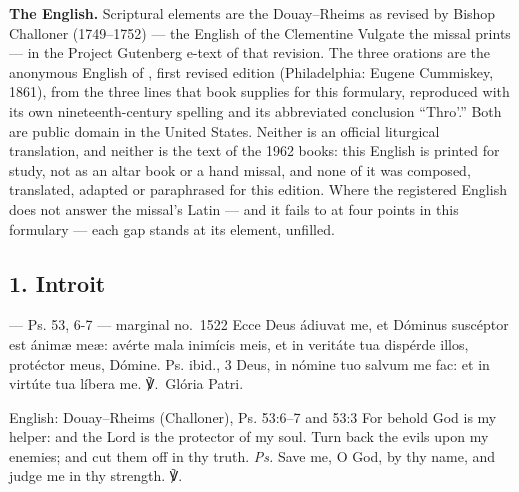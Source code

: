 \textbf{The English.} Scriptural elements are the Douay--Rheims as revised by
Bishop Challoner (1749--1752) --- the English of the Clementine Vulgate the
missal prints --- in the Project Gutenberg e-text of that revision. The three
orations are the anonymous English of , first revised edition
(Philadelphia: Eugene Cummiskey, 1861), from the three lines that book
supplies for this formulary, reproduced with its own nineteenth-century
spelling and its abbreviated conclusion ``Thro'.'' Both are public domain in
the United States. Neither is an official liturgical translation, and neither
is the text of the 1962 books: this English is printed for study, not as an
altar book or a hand missal, and none of it was composed, translated, adapted
or paraphrased for this edition. Where the registered
English does not answer the missal's Latin --- and it fails to at four points
in this formulary --- each gap stands at its element, unfilled.

\elementguard
\subsection*{1. Introit }

\begin{appointedlatin}{ --- Ps. 53, 6-7 --- marginal no.\ 1522}
Ecce Deus ádiuvat me, et Dóminus suscéptor est ánimæ meæ: avérte mala inimícis
meis, et in veritáte tua dispérde illos, protéctor meus, Dómine. \textnormal{Ps.
ibid., 3} Deus, in nómine tuo salvum me fac: et in virtúte tua líbera me.
℣.~Glória Patri.
\end{appointedlatin}

\begin{namedtranslation}{English: Douay--Rheims (Challoner), Ps. 53:6--7 and 53:3}
For behold God is my helper: and the Lord is the protector of my soul. Turn
back the evils upon my enemies; and cut them off in thy truth. \textit{Ps.}
Save me, O God, by thy name, and judge me in thy strength. ℣.~
\end{namedtranslation}


